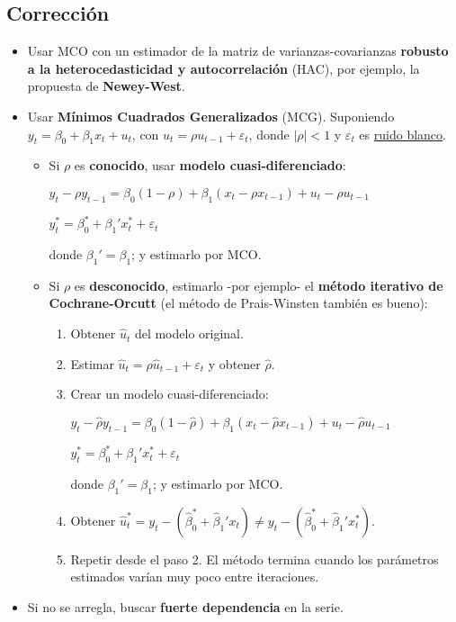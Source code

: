 \documentclass[10pt, a4paper, landscape]{extarticle}
\begin{document}
\begin{multicols}{3}
\begin{itemize}[leftmargin=*]
\end{itemize}

\subsection*{Corrección}

\begin{itemize}[leftmargin=*]
	\item Usar MCO con un estimador de la matriz de varianzas-covarianzas \textbf{robusto a la heterocedasticidad y autocorrelación} (HAC), por ejemplo, la propuesta de \textbf{Newey-West}.
	\item Usar \textbf{Mínimos Cuadrados Generalizados} (MCG). Suponiendo $y_t = \beta_0 + \beta_1 x_t + u_t$, con $u_t = \rho u_{t - 1} + \varepsilon_t$, donde $\lvert \rho \rvert < 1$ y $\varepsilon_t$ es \underline{ruido blanco}.
	\begin{itemize}[leftmargin=*]
		\item Si $\rho$ es \textbf{conocido}, usar \textbf{modelo cuasi-diferenciado}:
		\begin{center}
			$y_t - \rho y_{t - 1} = \beta_0 (1 - \rho) + \beta_1 (x_t - \rho x_{t - 1}) + u_t - \rho u_{t - 1}$
			
			$y_t^* = \beta_0^* + \beta_1' x_t^* + \varepsilon_t$
		\end{center}
		donde $\beta_1' = \beta_1$; y estimarlo por MCO.
		\item Si $\rho$ es \textbf{desconocido}, estimarlo -por ejemplo- el \textbf{método iterativo de Cochrane-Orcutt} (el método de Prais-Winsten también es bueno):
		\begin{enumerate}[leftmargin=*]
			\item Obtener $\hat{u}_t$ del modelo original.
			\item Estimar $\hat{u}_t = \rho \hat{u}_{t-1} + \varepsilon_t$ y obtener $\hat{\rho}$.
			\item Crear un modelo cuasi-diferenciado:
			\begin{center}
				$y_t - \hat{\rho} y_{t - 1} = \beta_0 (1 - \hat{\rho}) + \beta_1 (x_t - \hat{\rho} x_{t - 1}) + u_t - \hat{\rho} u_{t - 1}$
				
				$y_t^* = \beta_0^* + \beta_1' x_t^* + \varepsilon_t$
			\end{center}
			donde $\beta_1' = \beta_1$; y estimarlo por MCO.
			\item Obtener $\hat{u}_t^* = y_t - (\hat{\beta}_0^* + \hat{\beta}_1' x_t) \neq y_t - (\hat{\beta}_0^* + \hat{\beta}_1' x_t^*)$.
			\item Repetir desde el paso 2. El método termina cuando los parámetros estimados varían muy poco entre iteraciones.
		\end{enumerate}
	\end{itemize}
	\item Si no se arregla, buscar \textbf{fuerte dependencia} en la serie.
\end{itemize}


\end{multicols}
\end{document}
